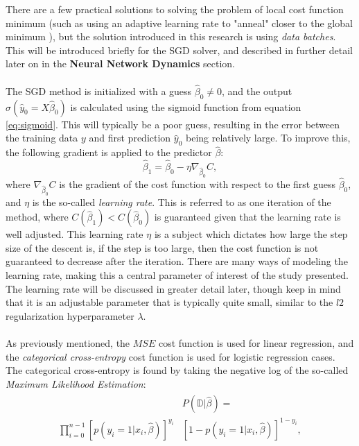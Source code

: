             There are a few practical solutions to solving the problem of local cost function minimum (such as using an adaptive learning rate to "anneal" closer to the global minimum \cite{stackexchangeminimum}), but the solution introduced in this research is using \textit{data batches}. This will be introduced briefly for the SGD solver, and described in further detail later on in the \textbf{Neural Network Dynamics} section.\\\\
            The SGD method is initialized with a guess $\hat{\beta}_0 \neq 0$, and the output $\sigma(\hat{y}_0=X\hat{\beta}_0)$ is calculated using the sigmoid function from equation \ref{eq:sigmoid}. This will typically be a poor guess, resulting in the error between the training data $y$ and first prediction $\hat{y}_0$ being relatively large. To improve this, the following gradient is applied to the predictor $\hat{\beta}$:
            \begin{equation}
                \hat{\beta}_1 = \hat{\beta}_0 - \eta \nabla_{\hat{\beta}_0}C,
            \end{equation}
            where $\nabla_{\hat{\beta}_0}C$ is the gradient of the cost function with respect to the first guess $\hat{\beta}_0$, and $\eta$ is the so-called \textit{learning rate}. This is referred to as one iteration of the method, where $C(\hat{\beta}_1) < C(\hat{\beta}_0)$ is guaranteed given that the learning rate is well adjusted. This learning rate $\eta$ is a subject which dictates how large the step size of the descent is, if the step is too large, then the cost function is not guaranteed to decrease after the iteration. There are many ways of modeling the learning rate, making this a central parameter of interest of the study presented. The learning rate will be discussed in greater detail later, though keep in mind that it is an adjustable parameter that is typically quite small, similar to the $l2$ regularization hyperparameter $\lambda$. %
            \\\\
            As previously mentioned, the $MSE$ cost function is used for linear regression, and the \textit{categorical cross-entropy} cost function is used for logistic regression
            cases. The categorical cross-entropy is found by taking the negative log of the so-called \textit{Maximum Likelihood Estimation}:
            \begin{align}
                \begin{split}
                    &P(\mathds{D}|\hat{\beta}) =\\ \prod^{n-1}_{i=0} \left[ p(y_i=1|x_i, \hat{\beta}) \right]^{y_i}&\left[ 1-p(y_i=1|x_i, \hat{\beta}) \right]^{1-y_i},
                \end{split}
            \end{align}
